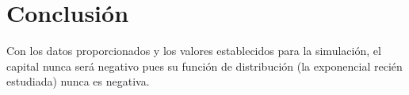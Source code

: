 \documentclass[spanish]{article}
\begin{document}
\section{Conclusi\'on}
Con los datos proporcionados y los valores establecidos para la simulaci\'on, el capital nunca ser\'a negativo pues su funci\'on de distribuci\'on (la exponencial reci\'en estudiada) nunca es negativa.
\end{document}
